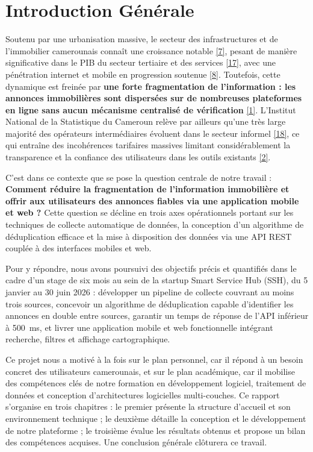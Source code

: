 
\chapter*{Introduction Générale}

Soutenu par une urbanisation massive, le secteur des infrastructures et de l'immobilier camerounais connaît une croissance notable \hyperref[ref:africanvestor]{[7]}, pesant de manière significative dans le PIB du secteur tertiaire et des services \hyperref[ref:beac]{[17]}, avec une pénétration internet et mobile en progression soutenue \hyperref[ref:datareportal]{[8]}. Toutefois, cette dynamique est freinée par \textbf{une forte fragmentation de l'information : les annonces immobilières sont dispersées sur de nombreuses plateformes en ligne sans aucun mécanisme centralisé de vérification} \hyperref[ref:ndah]{[1]}. L'Institut National de la Statistique du Cameroun relève par ailleurs qu'une très large majorité des opérateurs intermédiaires évoluent dans le secteur informel \hyperref[ref:ins]{[18]}, ce qui entraîne des incohérences tarifaires massives limitant considérablement la transparence et la confiance des utilisateurs dans les outils existants \hyperref[ref:strataxis]{[2]}.

C'est dans ce contexte que se pose la question centrale de notre travail : \textbf{Comment réduire la fragmentation de l'information immobilière et offrir aux utilisateurs des annonces fiables via une application mobile et web ?} Cette question se décline en trois axes opérationnels portant sur les techniques de collecte automatique de données, la conception d'un algorithme de déduplication efficace et la mise à disposition des données via une API REST couplée à des interfaces mobiles et web.

Pour y répondre, nous avons poursuivi des objectifs précis et quantifiés dans le cadre d'un stage de six mois au sein de la startup Smart Service Hub (SSH), du 5 janvier au 30 juin 2026 : développer un pipeline de collecte couvrant au moins trois sources, concevoir un algorithme de déduplication capable d'identifier les annonces en double entre sources, garantir un temps de réponse de l'API inférieur à 500~ms, et livrer une application mobile et web fonctionnelle intégrant recherche, filtres et affichage cartographique.

Ce projet nous a motivé à la fois sur le plan personnel, car il répond à un besoin concret des utilisateurs camerounais, et sur le plan académique, car il mobilise des compétences clés de notre formation en développement logiciel, traitement de données et conception d'architectures logicielles multi-couches. Ce rapport s'organise en trois chapitres : le premier présente la structure d'accueil et son environnement technique ; le deuxième détaille la conception et le développement de notre plateforme ; le troisième évalue les résultats obtenus et propose un bilan des compétences acquises. Une conclusion générale clôturera ce travail.
